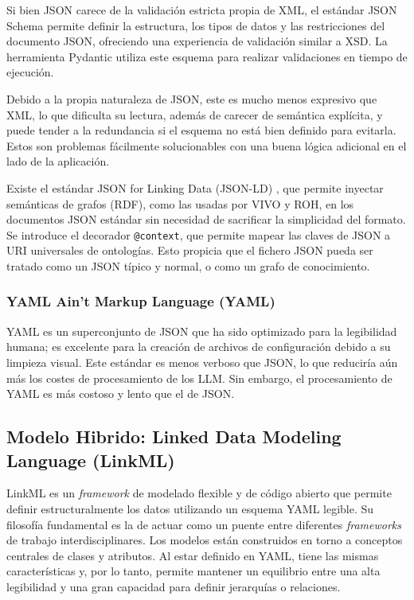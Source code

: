 \documentclass[12pt,a4paper]{article}
\begin{document}
Si bien JSON carece de la validación estricta propia de XML, el estándar JSON Schema permite definir la estructura, los tipos de datos y las restricciones del documento JSON, ofreciendo una experiencia de validación similar a XSD. La herramienta Pydantic utiliza este esquema para realizar validaciones en tiempo de ejecución.

Debido a la propia naturaleza de JSON, este es mucho menos expresivo que XML, lo que dificulta su lectura, además de carecer de semántica explícita, y puede tender a la redundancia si el esquema no está bien definido para evitarla. Estos son problemas fácilmente solucionables con una buena lógica adicional en el lado de la aplicación.

Existe el estándar JSON for Linking Data (JSON-LD) \cite{json_ld_org}, que permite inyectar semánticas de grafos (RDF), como las usadas por VIVO y ROH, en los documentos JSON estándar sin necesidad de sacrificar la simplicidad del formato. Se introduce el decorador \texttt{@context}, que permite mapear las claves de JSON a URI universales de ontologías. Esto propicia que el fichero JSON pueda ser tratado como un JSON típico y normal, o como un grafo de conocimiento.

\newpage

\subsubsection{YAML Ain't Markup Language (YAML)}

YAML \cite{yaml_org} es un superconjunto de JSON que ha sido optimizado para la legibilidad humana; es excelente para la creación de archivos de configuración debido a su limpieza visual. Este estándar es menos verboso que JSON, lo que reduciría aún más los costes de procesamiento de los LLM. Sin embargo, el procesamiento de YAML es más costoso y lento que el de JSON.

 
\subsection{Modelo Hibrido: Linked Data Modeling Language (LinkML)}

LinkML \cite{linkml_io} es un \textit{framework} de modelado flexible y de código abierto que permite definir estructuralmente los datos utilizando un esquema YAML legible. Su filosofía fundamental es la de actuar como un puente entre diferentes \textit{frameworks} de trabajo interdisciplinares. Los modelos están construidos en torno a conceptos centrales de clases y atributos. Al estar definido en YAML, tiene las mismas características y, por lo tanto, permite mantener un equilibrio entre una alta legibilidad y una gran capacidad para definir jerarquías o relaciones.
\end{document}
